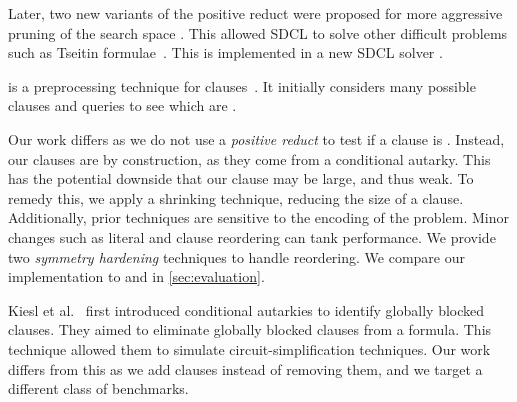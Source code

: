 Later, two new variants of the positive reduct were proposed for more aggressive pruning of the search space \cite{sadical}. This allowed SDCL to solve other difficult problems such as Tseitin formulae~\cite{hardexamplesresolution}. This is implemented in a new SDCL solver \sadical.


\prelearn is a preprocessing technique for \pr clauses~\cite{prelearn}. It initially considers many possible clauses and queries \sadical to see which are \pr.

Our work differs as we do not use a \emph{positive reduct} to test if a clause
is \pr. Instead, our clauses are \pr by construction, as they come from a conditional
autarky. This has the potential downside that our clause may be large, and thus weak. To
remedy this, we apply a shrinking technique, reducing the size of a clause.
Additionally, prior techniques are sensitive to the encoding of the problem.
Minor changes such as literal and clause reordering can tank performance. We
provide two \emph{symmetry hardening} techniques to handle reordering. We
compare our implementation \tool to \sadical and \prelearn in
\autoref{sec:evaluation}.

Kiesl et al.~\cite{conditionalautarkies} first introduced conditional autarkies to identify globally blocked clauses. They aimed to eliminate globally blocked clauses from a formula. This technique allowed them to simulate circuit-simplification techniques. Our work differs from this as we add clauses instead of removing them, and we target a different class of benchmarks.
